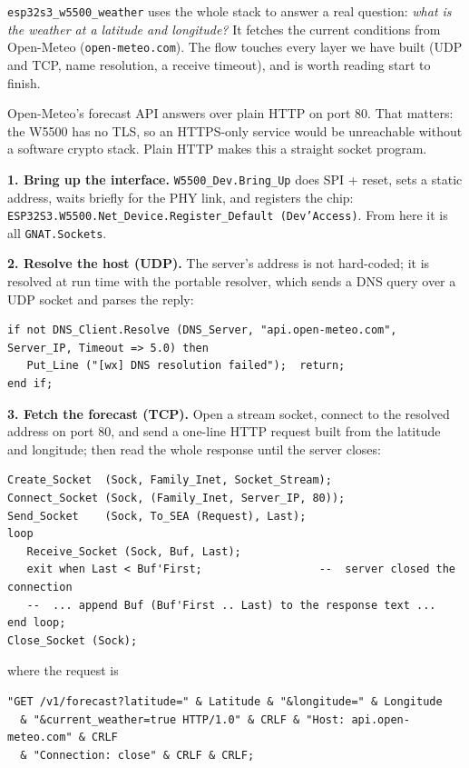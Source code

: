 \texttt{esp32s3\_w5500\_weather} uses the whole stack to answer a real question:
\emph{what is the weather at a latitude and longitude?} It fetches the current
conditions from Open-Meteo (\texttt{open-meteo.com}). The flow touches every layer
we have built (UDP and TCP, name resolution, a receive timeout), and is worth
reading start to finish.

Open-Meteo's forecast API answers over plain HTTP on port 80. That matters: the
W5500 has no TLS, so an HTTPS-only service would be unreachable without a software
crypto stack. Plain HTTP makes this a straight socket program.

\textbf{1. Bring up the interface.} \texttt{W5500\_Dev.Bring\_Up} does SPI + reset,
sets a static address, waits briefly for the PHY link, and registers the chip:
\texttt{ESP32S3.W5500.Net\_Device.Register\_Default (Dev'Access)}. From here it is
all \texttt{GNAT.Sockets}.

\textbf{2. Resolve the host (UDP).} The server's address is not hard-coded; it is
resolved at run time with the portable resolver, which sends a DNS query over a UDP
socket and parses the reply:

\begin{lstlisting}
if not DNS_Client.Resolve (DNS_Server, "api.open-meteo.com", Server_IP, Timeout => 5.0) then
   Put_Line ("[wx] DNS resolution failed");  return;
end if;
\end{lstlisting}

\textbf{3. Fetch the forecast (TCP).} Open a stream socket, connect to the resolved
address on port 80, and send a one-line HTTP request built from the latitude and
longitude; then read the whole response until the server closes:

\begin{lstlisting}
Create_Socket  (Sock, Family_Inet, Socket_Stream);
Connect_Socket (Sock, (Family_Inet, Server_IP, 80));
Send_Socket    (Sock, To_SEA (Request), Last);
loop
   Receive_Socket (Sock, Buf, Last);
   exit when Last < Buf'First;                  --  server closed the connection
   --  ... append Buf (Buf'First .. Last) to the response text ...
end loop;
Close_Socket (Sock);
\end{lstlisting}

where the request is

\begin{lstlisting}
"GET /v1/forecast?latitude=" & Latitude & "&longitude=" & Longitude
  & "&current_weather=true HTTP/1.0" & CRLF & "Host: api.open-meteo.com" & CRLF
  & "Connection: close" & CRLF & CRLF;
\end{lstlisting}

